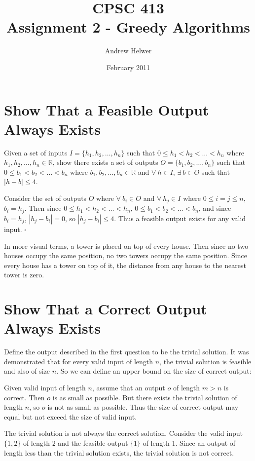 \documentclass{article}
\begin{document}
\title{CPSC 413 \\ Assignment 2 - Greedy Algorithms}
\author{Andrew Helwer}
\date{February 2011}
\maketitle

\section{Show That a Feasible Output Always Exists}

Given a set of inputs $I=\{h_1,h_2,\ldots,h_n\}$ such that $0 \leq h_1 < h_2 <
\ldots < h_n$ where $h_1,h_2,\ldots,h_n \in \mathbb{R}$, show there exists a
set of outputs $O=\{b_1,b_2,\ldots,b_n\}$ such that $0 \leq b_1 < b_2 <
\ldots < b_n$ where $b_1,b_2,\ldots,b_n \in \mathbb{R}$ and $\forall \: h \in
I$, $\exists \: b \in O$ such that $|h - b| \leq 4$.

Consider the set of outputs $O$ where $\forall \: b_i \in O$ and $\forall \:
h_j \in I$ where $0 \leq i = j \leq n$, $b_i = h_j$. Then since $0 \leq h_1 <
h_2 < \ldots < h_n$, $0 \leq b_1 < b_2 < \ldots < b_n$, and since $b_i = h_j$,
$|h_j-b_i|=0$, so $|h_j-b_i| \leq 4$. Thus a feasible output exists for any
valid input. $\square$

In more visual terms, a tower is placed on top of every house. Then since no two
houses occupy the same position, no two towers occupy the same position. Since
every house has a tower on top of it, the distance from any house to the nearest
tower is zero.

\section{Show That a Correct Output Always Exists}

Define the output described in the first question to be the trivial solution. It
was demonstrated that for every valid input of length $n$, the trivial solution
is feasible and also of size $n$. So we can define an upper bound on the size
of correct output:

Given valid input of length $n$, assume that an output $o$ of length $m > n$
is correct. Then $o$ is as small as possible. But there exists the trivial
solution of length $n$, so $o$ is not as small as possible. Thus the size of
correct output may equal but not exceed the size of valid input.

The trivial solution is not always the correct solution. Consider the valid
input $\{1,2\}$ of length 2 and the feasible output $\{1\}$ of length 1. Since
an output of length less than the trivial solution exists, the trivial solution
is not correct.
\end{document}
